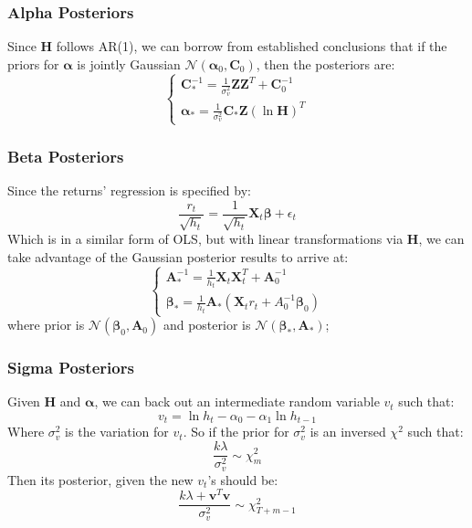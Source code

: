\documentclass[letterpaper]{article}
\newcommand{\XX}{\mathbf{X}}
\newcommand{\ZZ}{\mathbf{Z}}
\begin{document}
	\subsubsection{Alpha Posteriors}
	Since $\bm{H}$ follows AR(1), we can borrow from established conclusions that if the priors for $\bm{\alpha}$ is jointly Gaussian $\mathcal{N}(\bm{\alpha}_0,\bm{C}_0)$, then the posteriors are:
	\begin{equation}
	\begin{cases}
	\bm{C}_*^{-1}=\frac{1}{\sigma^2_v}\ZZ\ZZ^T+\bm{C}_0^{-1}\\
	\bm{\alpha}_*=\frac{1}{\sigma_v^2}\bm{C}_*\ZZ(\ln\mathbf{H})^T
	\end{cases}
	\end{equation}
	\subsubsection{Beta Posteriors}
	Since the returns' regression is specified by:
	\begin{equation}
	\frac{r_{t}}{\sqrt{h_t}} =\frac{1}{\sqrt{h_t}}\XX_t\bm{\beta}+\epsilon_{t}
	\end{equation}
	Which is in a similar form of OLS, but with linear transformations via $\bm{H}$, we can take advantage of the Gaussian posterior results to arrive at:
	\begin{equation}
	\begin{cases}
	\bm{A}_*^{-1}=\frac{1}{h_t}\XX_t\XX_t^T+\bm{A}_0^{-1}\\
	\bm{\beta}_*=\frac{1}{h_t}\bm{A}_*(\XX_tr_t+A_0^{-1}\bm{\beta}_{0})
	\end{cases}
	\end{equation}
	where prior is $\mathcal{N}(\bm{\beta}_0,\bm{A}_0)$ and posterior is $\mathcal{N}(\bm{\beta}_*,\bm{A}_*)$;
	\subsubsection{Sigma Posteriors}
	Given $\bm{H}$ and $\bm{\alpha}$, we can back out an intermediate random variable $v_t$ such that:
	\begin{equation}
	v_t=\ln h_t-\alpha_{0}-\alpha_{1}\ln h_{t-1}
	\end{equation}
	Where $\sigma_{v}^2$ is the variation for $v_t$. So if the prior for $\sigma_{v}^2$ is an inversed $\chi^2$ such that:
	\begin{equation}
	\frac{k\lambda}{\sigma_{v}^2}\sim\chi^2_m
	\end{equation}
	Then its posterior, given the new $v_t$'s should be:
	\begin{equation}
	\frac{k\lambda+\bm{v}^T\bm{v}}{\sigma_{v}^2}\sim\chi_{T+m-1}^2
	\end{equation}
\end{document}
